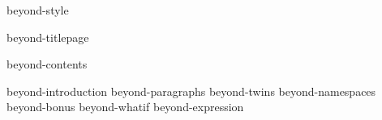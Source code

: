 
\environment beyond-style

\dontcomplain

\startdocument

    \component beyond-titlepage

    \startfrontmatter
        \component beyond-contents
    \stopfrontmatter

    \startbodymatter
        \component beyond-introduction
        \component beyond-paragraphs
        \component beyond-twins
        \component beyond-namespaces
        \component beyond-bonus
        \component beyond-whatif
        \component beyond-expression

         \stopchapter
         \stopchapter
         \stopchapter
         \stopchapter


    \stopbodymatter

\stopdocument


